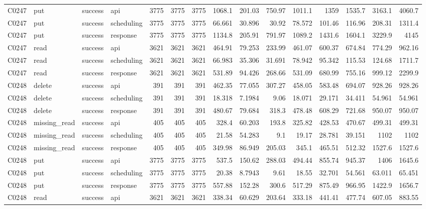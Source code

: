 \begin{landscape}
\begin{longtable}{llllrrrrrrrrrrr}
C0247 & put & success & api & 3775 & 3775 & 3775 & 1068.1 & 201.03 & 750.97 & 1011.1 & 1359 & 1535.7 & 3163.1 & 4060.7\\
C0247 & put & success & scheduling & 3775 & 3775 & 3775 & 66.661 & 30.896 & 30.92 & 78.572 & 101.46 & 116.96 & 208.31 & 1311.4\\
C0247 & put & success & response & 3775 & 3775 & 3775 & 1134.8 & 205.91 & 791.97 & 1089.2 & 1431.6 & 1604.1 & 3229.9 & 4145\\
C0247 & read & success & api & 3621 & 3621 & 3621 & 464.91 & 79.253 & 233.99 & 461.07 & 600.37 & 674.84 & 774.29 & 962.16\\
C0247 & read & success & scheduling & 3621 & 3621 & 3621 & 66.983 & 35.306 & 31.691 & 78.942 & 95.342 & 115.53 & 124.68 & 1711.7\\
C0247 & read & success & response & 3621 & 3621 & 3621 & 531.89 & 94.426 & 268.66 & 531.09 & 680.99 & 755.16 & 999.12 & 2299.9\\
C0248 & delete & success & api & 391 & 391 & 391 & 462.35 & 77.055 & 307.27 & 458.05 & 583.48 & 694.07 & 928.26 & 928.26\\
C0248 & delete & success & scheduling & 391 & 391 & 391 & 18.318 & 7.1984 & 9.06 & 18.071 & 29.171 & 34.411 & 54.961 & 54.961\\
C0248 & delete & success & response & 391 & 391 & 391 & 480.67 & 79.684 & 318.3 & 478.48 & 608.29 & 721.68 & 950.07 & 950.07\\
C0248 & missing\_\allowbreak{}read & success & api & 405 & 405 & 405 & 328.4 & 60.203 & 193.8 & 325.82 & 428.53 & 470.67 & 499.31 & 499.31\\
C0248 & missing\_\allowbreak{}read & success & scheduling & 405 & 405 & 405 & 21.58 & 54.283 & 9.1 & 19.17 & 28.781 & 39.151 & 1102 & 1102\\
C0248 & missing\_\allowbreak{}read & success & response & 405 & 405 & 405 & 349.98 & 86.949 & 205.03 & 345.1 & 465.51 & 512.32 & 1527.6 & 1527.6\\
C0248 & put & success & api & 3775 & 3775 & 3775 & 537.5 & 150.62 & 288.03 & 494.44 & 855.74 & 945.37 & 1406 & 1645.6\\
C0248 & put & success & scheduling & 3775 & 3775 & 3775 & 20.38 & 8.7943 & 9.61 & 18.55 & 32.701 & 54.561 & 63.011 & 65.451\\
C0248 & put & success & response & 3775 & 3775 & 3775 & 557.88 & 152.28 & 300.6 & 517.29 & 875.49 & 966.95 & 1422.9 & 1656.7\\
C0248 & read & success & api & 3621 & 3621 & 3621 & 338.34 & 60.629 & 203.64 & 333.18 & 441.41 & 477.74 & 607.05 & 883.55\\

\end{longtable}
\end{landscape}
